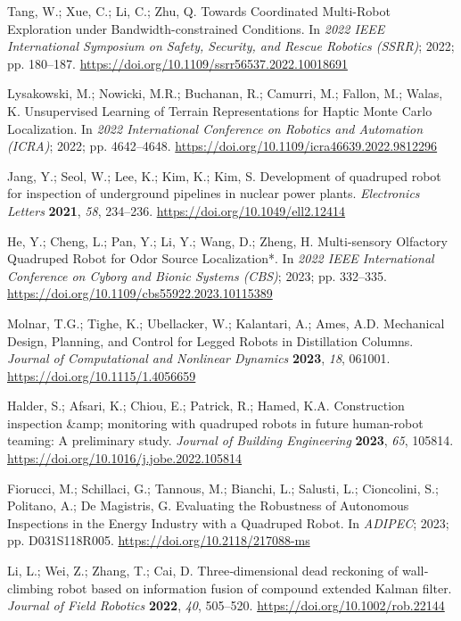 Tang, W.; Xue, C.; Li, C.; Zhu, Q. Towards Coordinated Multi-Robot Exploration under Bandwidth-constrained Conditions. In \emph{2022 IEEE International Symposium on Safety, Security, and Rescue Robotics (SSRR)}; 2022; pp. 180--187. \url{https://doi.org/10.1109/ssrr56537.2022.10018691}

Lysakowski, M.; Nowicki, M.R.; Buchanan, R.; Camurri, M.; Fallon, M.; Walas, K. Unsupervised Learning of Terrain Representations for Haptic Monte Carlo Localization. In \emph{2022 International Conference on Robotics and Automation (ICRA)}; 2022; pp. 4642--4648. \url{https://doi.org/10.1109/icra46639.2022.9812296}

Jang, Y.; Seol, W.; Lee, K.; Kim, K.; Kim, S. Development of quadruped robot for inspection of underground pipelines in nuclear power plants. \emph{Electronics Letters} \textbf{2021}, \emph{58}, 234--236. \url{https://doi.org/10.1049/ell2.12414}

He, Y.; Cheng, L.; Pan, Y.; Li, Y.; Wang, D.; Zheng, H. Multi-sensory Olfactory Quadruped Robot for Odor Source Localization*. In \emph{2022 IEEE International Conference on Cyborg and Bionic Systems (CBS)}; 2023; pp. 332--335. \url{https://doi.org/10.1109/cbs55922.2023.10115389}

Molnar, T.G.; Tighe, K.; Ubellacker, W.; Kalantari, A.; Ames, A.D. Mechanical Design, Planning, and Control for Legged Robots in Distillation Columns. \emph{Journal of Computational and Nonlinear Dynamics} \textbf{2023}, \emph{18}, 061001. \url{https://doi.org/10.1115/1.4056659}

Halder, S.; Afsari, K.; Chiou, E.; Patrick, R.; Hamed, K.A. Construction inspection \&amp; monitoring with quadruped robots in future human-robot teaming: A preliminary study. \emph{Journal of Building Engineering} \textbf{2023}, \emph{65}, 105814. \url{https://doi.org/10.1016/j.jobe.2022.105814}

Fiorucci, M.; Schillaci, G.; Tannous, M.; Bianchi, L.; Salusti, L.; Cioncolini, S.; Politano, A.; De Magistris, G. Evaluating the Robustness of Autonomous Inspections in the Energy Industry with a Quadruped Robot. In \emph{ADIPEC}; 2023; pp. D031S118R005. \url{https://doi.org/10.2118/217088-ms}

Li, L.; Wei, Z.; Zhang, T.; Cai, D. Three‐dimensional dead reckoning of wall‐climbing robot based on information fusion of compound extended Kalman filter. \emph{Journal of Field Robotics} \textbf{2022}, \emph{40}, 505--520. \url{https://doi.org/10.1002/rob.22144}

